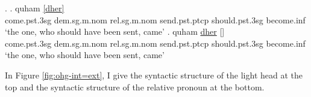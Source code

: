 \ex.\label{ex:ohg-nom-nom-rep}
\ag. quham \underline{[dher]}  \underline{}  \\
 come.\ac{pst}.3\ac{sg}\scsub{[nom]} \ac{dem}.\ac{sg}.\ac{m}.\ac{nom} \ac{rel}.\ac{sg}.\ac{m}.\ac{nom} send.\ac{pst}.\ac{ptcp}\scsub{[nom]} should.\ac{pst}.3\ac{sg} become.\ac{inf}\\
 `the one, who should have been sent, came' \label{ex:ohg-nom-nom-rep-rel}
\bg. quham \underline{dher} [] \underline{}  \\
 come.\ac{pst}.3\ac{sg}\scsub{[nom]} \ac{dem}.\ac{sg}.\ac{m}.\ac{nom} \ac{rel}.\ac{sg}.\ac{m}.\ac{nom} send.\ac{pst}.\ac{ptcp}\scsub{[nom]} should.\ac{pst}.3\ac{sg} become.\ac{inf}\\
 `the one, who should have been sent, came' \label{ex:ohg-nom-nom-rep-lh}

In Figure \ref{fig:ohg-int=ext}, I give the syntactic structure of the light head at the top and the syntactic structure of the relative pronoun at the bottom.

